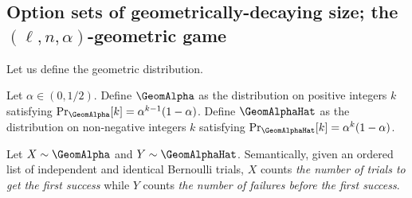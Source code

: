 
\subsection{Option sets of geometrically-decaying size; the \texorpdfstring{$(\ell, n, \alpha)$-}{}geometric game}


Let us define the geometric distribution.
\begin{definition}\label{def:geometric-dist}
    Let $\alpha \in (0, 1/2)$. 
    Define $\GeomAlpha$ as the distribution on positive integers $k$ 
    satisfying $\Pr_{\GeomAlpha}[k] = \alpha^{k-1}(1 - \alpha)$. 
    Define $\GeomAlphaHat$ as the distribution on non-negative integers $k$ 
    satisfying $\Pr_{\GeomAlphaHat}[k] = \alpha^k(1 - \alpha)$. 
\end{definition}
Let $X \sim \GeomAlpha$ and 
$Y \sim \GeomAlphaHat$. 
Semantically, given an ordered list of independent and identical Bernoulli trials, 
$X$ counts \emph{the number of trials to get the first success}
while $Y$ counts \emph{the number of failures before the first success}.

